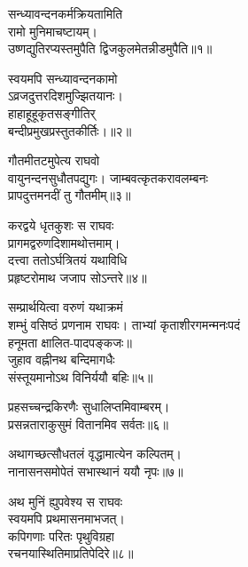 

\storymeta

\begin{flushleft}
    

सन्ध्यावन्दनकर्मक्रियतामिति\\
रामो मुनिमाचष्टायम्।\\
उष्णद्युतिरप्यस्तमुपैति
द्विजकुलमेतन्नीडमुपैति॥१॥

स्वयमपि सन्ध्यावन्दनकामो\\
ऽव्रजदुत्तरदिशमुज्झितयानः।\\
हाहाहूहूकृतसङ्गीतिर्\\
बन्दीप्रमुखप्रस्तुतकीर्तिः।॥२॥

गौतमीतटमुपेत्य राघवो\\
वायुनन्दनसुधौतपद्युगः।
जाम्बवत्कृतकरावलम्बनः\\
प्रापदुत्तमनदीं तु गौतमीम्॥३॥

करद्वये धृतकुशः स राघवः\\
प्रागमद्वरुणदिशामथोत्तमाम्।\\
दत्त्वा ततोऽर्घत्रितयं यथाविधि\\
प्रहृष्टरोमाथ जजाप सोऽन्तरे॥४॥

सम्प्रार्थयित्वा वरुणं यथाक्रमं\\
शम्भुं वसिष्ठं प्रणनाम राघवः।
ताभ्यां कृताशीरगमन्मनःपदं\\
हनूमता क्षालित-पादपङ्कजः॥\\
जुहाव वह्नीनथ बन्दिमागधैः\\
संस्तूयमानोऽथ विनिर्ययौ बहिः॥५॥

प्रहसच्चन्द्रकिरणैः सुधालिप्तमिवाम्बरम्।\\
प्रसन्नताराकुसुमं वितानमिव सर्वतः॥६॥

अथागच्छत्सौधतलं वृद्धामात्येन कल्पितम्।\\
नानासनसमोपेतं सभास्थानं ययौ नृपः॥७॥

अथ मुनिं ह्युपवेश्य स राघवः\\
स्वयमपि प्रथमासनमाभजत्।\\
कपिगणाः परितः पृथुविग्रहा\\
रचनयास्थितिमाप्रतिपेदिरे॥८॥


\end{flushleft}
